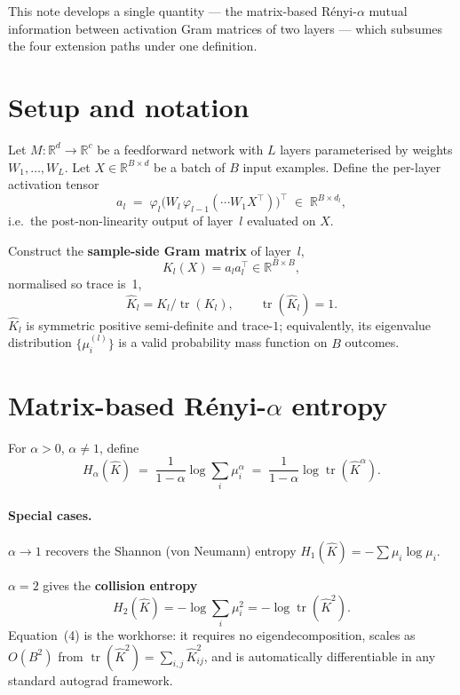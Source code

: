 \documentclass[11pt,a4paper]{article}
\newcommand{\trace}{\operatorname{tr}}
\newcommand{\Khat}{\hat{K}}
\begin{document}
This note develops a single quantity --- the matrix-based R\'enyi-$\alpha$
mutual information between activation Gram matrices of two layers --- which
subsumes the four extension paths under one definition.

\section{Setup and notation}

Let $M : \mathbb{R}^d \to \mathbb{R}^c$ be a feedforward network with $L$
layers parameterised by weights $W_1, \dots, W_L$. Let $X \in
\mathbb{R}^{B \times d}$ be a batch of $B$ input examples. Define the
per-layer activation tensor
\[
a_l \;=\; \varphi_l\bigl( W_l\, \varphi_{l-1}(\cdots W_1 X^\top) \bigr)^\top
   \;\in\; \mathbb{R}^{B \times d_l},
\]
i.e.\ the post-non-linearity output of layer~$l$ evaluated on $X$.

Construct the \textbf{sample-side Gram matrix} of layer~$l$,
\[
K_l(X) = a_l a_l^\top \in \mathbb{R}^{B \times B},  \tag{1}
\]
normalised so trace is~1,
\[
\Khat_l = K_l / \trace(K_l), \qquad \trace(\Khat_l) = 1. \tag{2}
\]
$\Khat_l$ is symmetric positive semi-definite and trace-$1$; equivalently,
its eigenvalue distribution $\{\mu_i^{(l)}\}$ is a valid probability mass
function on $B$ outcomes.

\section{Matrix-based R\'enyi-$\alpha$ entropy}

For $\alpha > 0$, $\alpha \neq 1$, define
\begin{equation}
H_\alpha(\Khat) \;=\; \frac{1}{1-\alpha} \log \sum_i \mu_i^\alpha
            \;=\; \frac{1}{1-\alpha} \log \trace(\Khat^\alpha).  \tag{3}
\end{equation}

\paragraph{Special cases.}
$\alpha \to 1$ recovers the Shannon (von Neumann) entropy
$H_1(\Khat) = -\sum \mu_i \log \mu_i$.

$\alpha = 2$ gives the \textbf{collision entropy}
\[
H_2(\Khat) = -\log \sum_i \mu_i^2 = -\log \trace(\Khat^2).  \tag{4}
\]
Equation~(4) is the workhorse: it requires no eigendecomposition, scales
as $O(B^2)$ from $\trace(\Khat^2) = \sum_{i,j} \Khat_{ij}^2$, and is
automatically differentiable in any standard autograd framework.
\end{document}
